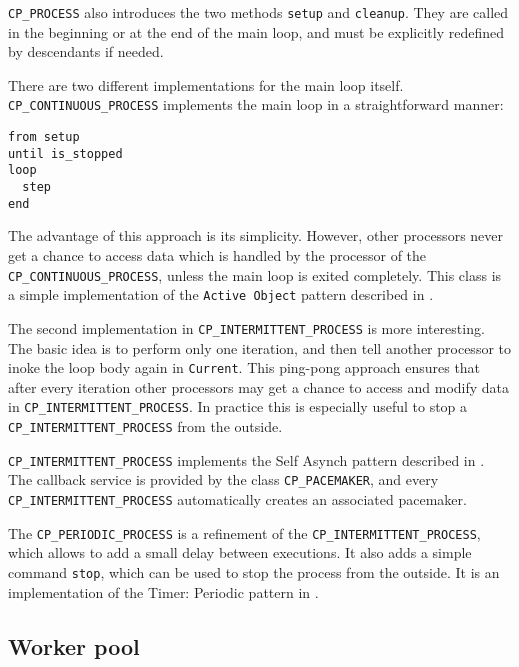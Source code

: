 \lstinline!CP_PROCESS! also introduces the two methods \lstinline!setup! and \lstinline!cleanup!.
They are called in the beginning or at the end of the main loop, and must be explicitly redefined by descendants if needed.

There are two different implementations for the main loop itself.
\lstinline!CP_CONTINUOUS_PROCESS! implements the main loop in a straightforward manner:
\begin{lstlisting}
from setup
until is_stopped
loop
  step
end
\end{lstlisting}
The advantage of this approach is its simplicity.
However, other processors never get a chance to access data which is handled by the processor of the \lstinline!CP_CONTINUOUS_PROCESS!, unless the main loop is exited completely.
This class is a simple implementation of the \lstinline!Active Object! pattern described in .

The second implementation in \lstinline!CP_INTERMITTENT_PROCESS! is more interesting.
The basic idea is to perform only one iteration, and then tell another processor to inoke the loop body again in \lstinline!Current!.
This ping-pong approach ensures that after every iteration other processors may get a chance to access and modify data in \lstinline!CP_INTERMITTENT_PROCESS!.
In practice this is especially useful to stop a \lstinline!CP_INTERMITTENT_PROCESS! from the outside.

\lstinline!CP_INTERMITTENT_PROCESS! implements the Self Asynch pattern described in .
The callback service is provided by the class \lstinline!CP_PACEMAKER!, and every \lstinline!CP_INTERMITTENT_PROCESS! automatically creates an associated pacemaker.

The \lstinline!CP_PERIODIC_PROCESS! is a refinement of the \lstinline!CP_INTERMITTENT_PROCESS!, which allows to add a small delay between executions.
It also adds a simple command \lstinline!stop!, which can be used to stop the process from the outside.
It is an implementation of the Timer: Periodic pattern in .

\subsection{Worker pool}
\label{sec:worker_pool} 

